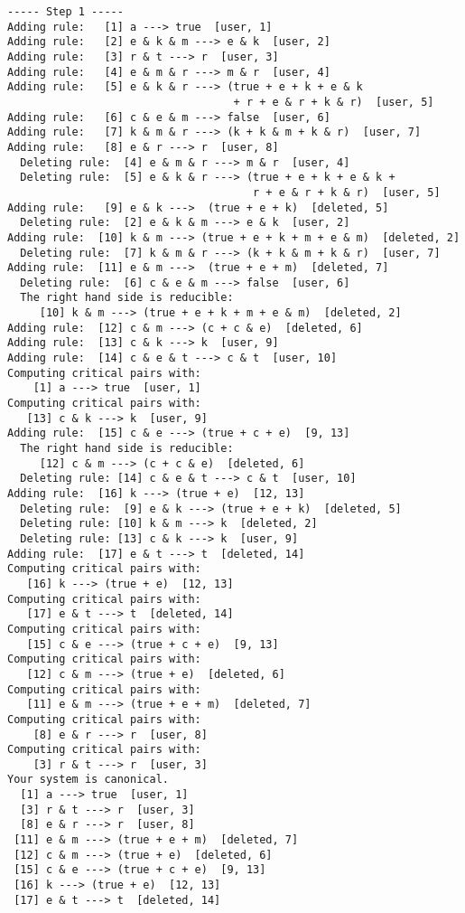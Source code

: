 \begin{verbatim}
----- Step 1 -----
Adding rule:   [1] a ---> true  [user, 1]
Adding rule:   [2] e & k & m ---> e & k  [user, 2]
Adding rule:   [3] r & t ---> r  [user, 3]
Adding rule:   [4] e & m & r ---> m & r  [user, 4]
Adding rule:   [5] e & k & r ---> (true + e + k + e & k 
                                   + r + e & r + k & r)  [user, 5]
Adding rule:   [6] c & e & m ---> false  [user, 6]
Adding rule:   [7] k & m & r ---> (k + k & m + k & r)  [user, 7]
Adding rule:   [8] e & r ---> r  [user, 8]
  Deleting rule:  [4] e & m & r ---> m & r  [user, 4]
  Deleting rule:  [5] e & k & r ---> (true + e + k + e & k + 
                                      r + e & r + k & r)  [user, 5]
Adding rule:   [9] e & k --->  (true + e + k)  [deleted, 5]
  Deleting rule:  [2] e & k & m ---> e & k  [user, 2]
Adding rule:  [10] k & m ---> (true + e + k + m + e & m)  [deleted, 2]
  Deleting rule:  [7] k & m & r ---> (k + k & m + k & r)  [user, 7]
Adding rule:  [11] e & m --->  (true + e + m)  [deleted, 7]
  Deleting rule:  [6] c & e & m ---> false  [user, 6]
  The right hand side is reducible:
     [10] k & m ---> (true + e + k + m + e & m)  [deleted, 2]
Adding rule:  [12] c & m ---> (c + c & e)  [deleted, 6]
Adding rule:  [13] c & k ---> k  [user, 9]
Adding rule:  [14] c & e & t ---> c & t  [user, 10]
Computing critical pairs with: 
    [1] a ---> true  [user, 1]
Computing critical pairs with: 
   [13] c & k ---> k  [user, 9]
Adding rule:  [15] c & e ---> (true + c + e)  [9, 13]
  The right hand side is reducible:
     [12] c & m ---> (c + c & e)  [deleted, 6]
  Deleting rule: [14] c & e & t ---> c & t  [user, 10]
Adding rule:  [16] k ---> (true + e)  [12, 13]
  Deleting rule:  [9] e & k ---> (true + e + k)  [deleted, 5]
  Deleting rule: [10] k & m ---> k  [deleted, 2]
  Deleting rule: [13] c & k ---> k  [user, 9]
Adding rule:  [17] e & t ---> t  [deleted, 14]
Computing critical pairs with: 
   [16] k ---> (true + e)  [12, 13]
Computing critical pairs with: 
   [17] e & t ---> t  [deleted, 14]
Computing critical pairs with: 
   [15] c & e ---> (true + c + e)  [9, 13]
Computing critical pairs with: 
   [12] c & m ---> (true + e)  [deleted, 6]
Computing critical pairs with: 
   [11] e & m ---> (true + e + m)  [deleted, 7]
Computing critical pairs with: 
    [8] e & r ---> r  [user, 8]
Computing critical pairs with: 
    [3] r & t ---> r  [user, 3]
Your system is canonical.
  [1] a ---> true  [user, 1]
  [3] r & t ---> r  [user, 3]
  [8] e & r ---> r  [user, 8]
 [11] e & m ---> (true + e + m)  [deleted, 7]
 [12] c & m ---> (true + e)  [deleted, 6]
 [15] c & e ---> (true + c + e)  [9, 13]
 [16] k ---> (true + e)  [12, 13]
 [17] e & t ---> t  [deleted, 14]
\end{verbatim}

